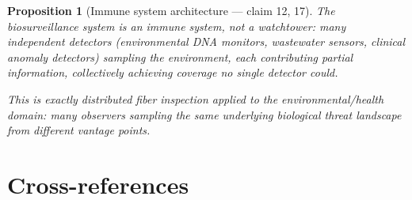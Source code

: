 \documentclass[11pt,a4paper]{article}
\newtheorem{proposition}[definition]{Proposition}
\begin{document}
\begin{proposition}[Immune system architecture --- claim 12, 17]
\label{prop:immune}
The biosurveillance system is an immune system, not a watchtower:
many independent detectors (environmental DNA monitors, wastewater
sensors, clinical anomaly detectors) sampling the environment, each
contributing partial information, collectively achieving coverage
no single detector could.

This is exactly distributed fiber inspection applied to the
environmental/health domain: many observers sampling the same
underlying biological threat landscape from different vantage points.
\end{proposition}


\section{Cross-references}
\end{document}
